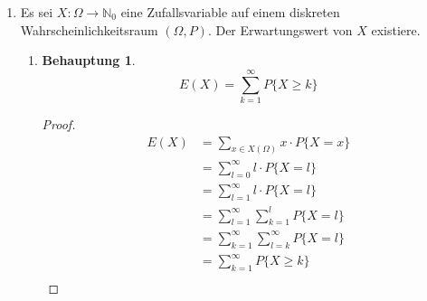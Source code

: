 \documentclass[a4paper]{scrartcl}
\newtheorem*{behaupt}{Behauptung}
\begin{document}
\begin{enumerate}[label=\bfseries\arabic*.]
\begin{proof}
\begin{equation*}
\begin{split}
                        \frac{\lambda_1^k}{(\lambda_1 + \lambda_2)^k} \cdot
                        \frac{\lambda_2^{s-k}}{(\lambda_1 + \lambda_2)^{s-k}} \\
                    &= \binom{s}{k} \cdot
                        \left( \frac{\lambda_1}{\lambda_1 + \lambda_2} \right)^k
                        \cdot
                        \left(\frac{\lambda_2}{\lambda_1+\lambda_2}\right)^{s-k}
                        \\
                    &= \binom{s}{k} \cdot
                        \left( \frac{\lambda_1}{\lambda_1 + \lambda_2} \right)^k
                        \cdot \left(1 - \frac{\lambda_1}{\lambda_1 + \lambda_2}
                        \right)^{s-k}
                \end{split}
            \end{equation*}
        \end{proof}

    \item
        Es sei $X\colon \Omega \to \mathbb{N}_0$ eine Zufallsvariable auf einem
        diskreten Wahrscheinlichkeitsraum $(\Omega, P)$.
        Der Erwartungswert von $X$ existiere.
        \begin{enumerate}[label=(\alph*)]
            \item
                \begin{behaupt}
                    \begin{equation*}
                        E(X) = \sum_{k=1}^\infty P\{X \geq k\}
                    \end{equation*}
                \end{behaupt}
                \begin{proof}
                    \begin{equation*}
                        \begin{split}
                            E(X)
                            &= \sum_{x \in X(\Omega)} x \cdot P\{X = x\} \\
                            &= \sum_{l = 0}^\infty l \cdot P\{X = l\} \\
                            &= \sum_{l = 1}^\infty l \cdot P\{X = l\} \\
                            &= \sum_{l = 1}^\infty \sum_{k = 1}^l P\{X = l\} \\
                            &= \sum_{k=1}^\infty \sum_{l=k}^\infty P\{X = l\} \\
                            &= \sum_{k=1}^\infty P\{X \geq k\} \\
                        \end{split}
                    \end{equation*}
                \end{proof}


\end{enumerate}
\end{enumerate}
\end{document}
